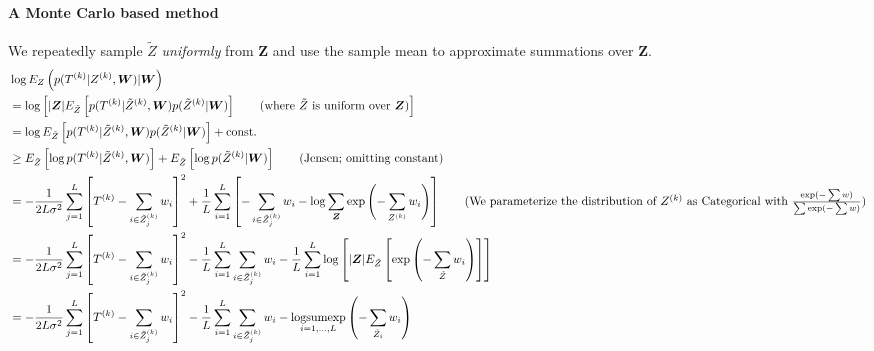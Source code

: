 \documentclass[12pt]{article}
\begin{document}
\paragraph{A Monte Carlo based method} We repeatedly sample $\tilde Z$ \emph{uniformly} from $\bm Z$ and use the sample mean to approximate summations over $\bm Z$. \begin{align*}
&\log E_Z\pr{p(T\uppr{k} | Z\uppr{k}, \bm W)| \bm W} \\&= \log\bk{ |\bm Z|E_{\tilde Z}\bk{p(T\uppr{k} | \tilde Z\uppr{k},\bm W)p(\tilde Z\uppr{k} | \bm W)} \tag{where $\tilde Z$ is uniform over $\bm Z$}} \\
&= \log E_{\tilde Z}\bk{p(T\uppr{k} | \tilde Z\uppr{k},\bm W)p(\tilde Z\uppr{k} | \bm W)} + \text{const.} \\
&\ge E_{\tilde Z}\bk{\log p(T\uppr{k} | \tilde Z\uppr{k},\bm W)} + E_{\tilde Z}\bk{\log p(\tilde Z\uppr{k} | \bm W)} \tag{Jensen; omitting constant}\\
&= -\frac{1}{2L\sigma^2}\sum_{j=1}^L \bk{T\uppr{k} - \sum_{i\in \tilde Z\uppr{k}_j}w_i}^2 + \frac{1}{L}\sum_{i=1}^L \bk{-\sum_{i\in\tilde Z_{j}\uppr{k}}w_i - \log \sum_{\bm Z} \exp\pr{-\sum_{Z\uppr{k}} w_i}}  \tag{We parameterize the distribution of $Z\uppr{k}$ as Categorical with $\frac{\exp(-\sum w)}{\sum \exp(-\sum w)}$} \\
&= -\frac{1}{2L\sigma^2}\sum_{j=1}^L \bk{T\uppr{k} - \sum_{i\in \tilde Z\uppr{k}_j}w_i}^2 - \frac{1}{L}\sum_{i=1}^L \sum_{i\in\tilde Z_{j}\uppr{k}}w_i - \frac{1}{L}\sum_{i=1}^L \log\bk{|\bm Z| E_{\tilde Z}\bk{\exp\pr{-\sum_{\tilde Z} w_i}}} \\
&= -\frac{1}{2L\sigma^2}\sum_{j=1}^L \bk{T\uppr{k} - \sum_{i\in \tilde Z\uppr{k}_j}w_i}^2 - \frac{1}{L}\sum_{i=1}^L\sum_{i\in\tilde Z_{j}\uppr{k}}w_i - \underset{i=1,\ldots,L}{\text{logsumexp}}\pr{-\sum_{\tilde Z_i} w_i}
\end{align*}
\end{document}
